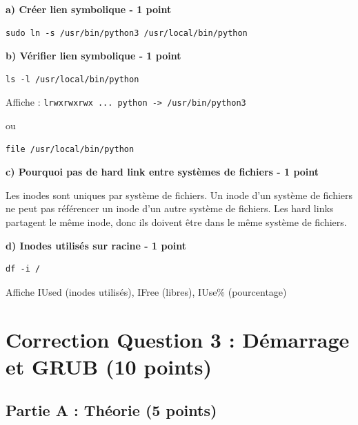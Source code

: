 \documentclass[12pt,a4paper]{article}
\begin{document}
\begin{answerbox}
\textbf{a) Créer lien symbolique - 1 point}
\begin{lstlisting}
sudo ln -s /usr/bin/python3 /usr/local/bin/python
\end{lstlisting}

\textbf{b) Vérifier lien symbolique - 1 point}
\begin{lstlisting}
ls -l /usr/local/bin/python
\end{lstlisting}
Affiche : \texttt{lrwxrwxrwx ... python -> /usr/bin/python3}

ou

\begin{lstlisting}
file /usr/local/bin/python
\end{lstlisting}

\textbf{c) Pourquoi pas de hard link entre systèmes de fichiers - 1 point}

Les inodes sont uniques par système de fichiers. Un inode d'un système de fichiers ne peut pas référencer un inode d'un autre système de fichiers. Les hard links partagent le même inode, donc ils doivent être dans le même système de fichiers.

\textbf{d) Inodes utilisés sur racine - 1 point}
\begin{lstlisting}
df -i /
\end{lstlisting}

Affiche IUsed (inodes utilisés), IFree (libres), IUse\% (pourcentage)
\end{answerbox}

\newpage


\section{Correction Question 3 : Démarrage et GRUB (10 points)}

\subsection*{Partie A : Théorie (5 points)}
\end{document}
